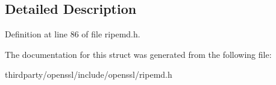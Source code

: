 \subsection{Detailed Description}


Definition at line 86 of file ripemd.\+h.



The documentation for this struct was generated from the following file\+:\begin{DoxyCompactItemize}
\item 
thirdparty/openssl/include/openssl/ripemd.\+h\end{DoxyCompactItemize}
